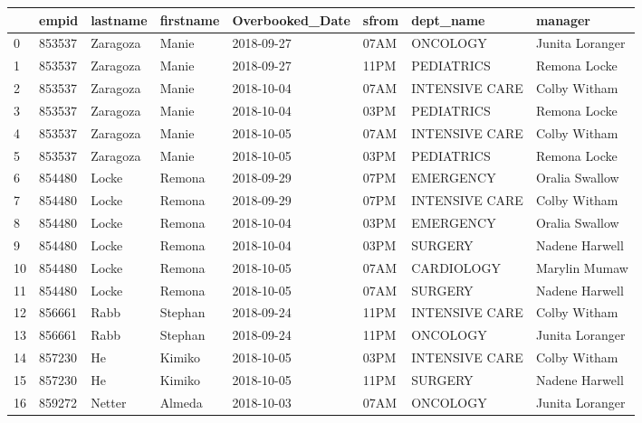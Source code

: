 \documentclass[11pt]{article}
\begin{document}
\begin{tabular}{|l|l|l|l|l|l|l|l|}
	\toprule
	{} &   empid &    lastname &  firstname & Overbooked\_Date & sfrom &       dept\_name &          manager \\
	\midrule
	0  &  853537 &    Zaragoza &      Manie &      2018-09-27 &  07AM &        ONCOLOGY &  Junita Loranger \\
	1  &  853537 &    Zaragoza &      Manie &      2018-09-27 &  11PM &      PEDIATRICS &     Remona Locke \\
	2  &  853537 &    Zaragoza &      Manie &      2018-10-04 &  07AM &  INTENSIVE CARE &     Colby Witham \\
	3  &  853537 &    Zaragoza &      Manie &      2018-10-04 &  03PM &      PEDIATRICS &     Remona Locke \\
	4  &  853537 &    Zaragoza &      Manie &      2018-10-05 &  07AM &  INTENSIVE CARE &     Colby Witham \\
	5  &  853537 &    Zaragoza &      Manie &      2018-10-05 &  03PM &      PEDIATRICS &     Remona Locke \\
	6  &  854480 &       Locke &     Remona &      2018-09-29 &  07PM &       EMERGENCY &   Oralia Swallow \\
	7  &  854480 &       Locke &     Remona &      2018-09-29 &  07PM &  INTENSIVE CARE &     Colby Witham \\
	8  &  854480 &       Locke &     Remona &      2018-10-04 &  03PM &       EMERGENCY &   Oralia Swallow \\
	9  &  854480 &       Locke &     Remona &      2018-10-04 &  03PM &         SURGERY &   Nadene Harwell \\
	10 &  854480 &       Locke &     Remona &      2018-10-05 &  07AM &      CARDIOLOGY &    Marylin Mumaw \\
	11 &  854480 &       Locke &     Remona &      2018-10-05 &  07AM &         SURGERY &   Nadene Harwell \\
	12 &  856661 &        Rabb &    Stephan &      2018-09-24 &  11PM &  INTENSIVE CARE &     Colby Witham \\
	13 &  856661 &        Rabb &    Stephan &      2018-09-24 &  11PM &        ONCOLOGY &  Junita Loranger \\
	14 &  857230 &          He &     Kimiko &      2018-10-05 &  03PM &  INTENSIVE CARE &     Colby Witham \\
	15 &  857230 &          He &     Kimiko &      2018-10-05 &  11PM &         SURGERY &   Nadene Harwell \\
	16 &  859272 &      Netter &     Almeda &      2018-10-03 &  07AM &        ONCOLOGY &  Junita Loranger \\

\end{tabular}
\end{document}
